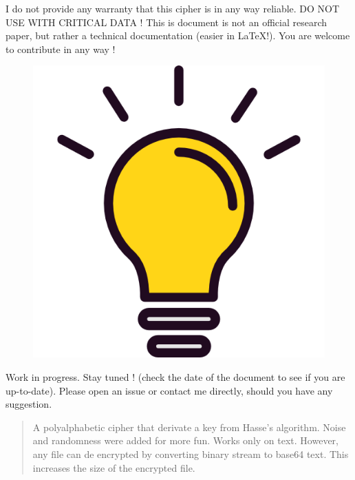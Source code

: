 \documentclass{article}
\begin{document}
I do not provide any warranty that this cipher is in any way reliable.
DO NOT USE WITH CRITICAL DATA !
\newline
This is document is not an official research paper, but rather a technical documentation (easier in \LaTeX !). You are welcome to 
contribute in any way !

\begin{figure}[H]
    \centering
    \includegraphics[scale=0.18]{bulb}
\end{figure}

Work in progress. Stay tuned ! (check the date of the document to see if you are up-to-date). Please open an issue or contact me directly, 
should you have any suggestion.

\newblock


\begin{abstract}
A polyalphabetic cipher that derivate a key from Hasse's algorithm. Noise and randomness were added for more fun. Works only on text. 
However, any file can de encrypted by converting binary stream to base64 text. This increases the size of the encrypted file.
\end{abstract}

\newpage
\tableofcontents
\newpage






\end{document}
